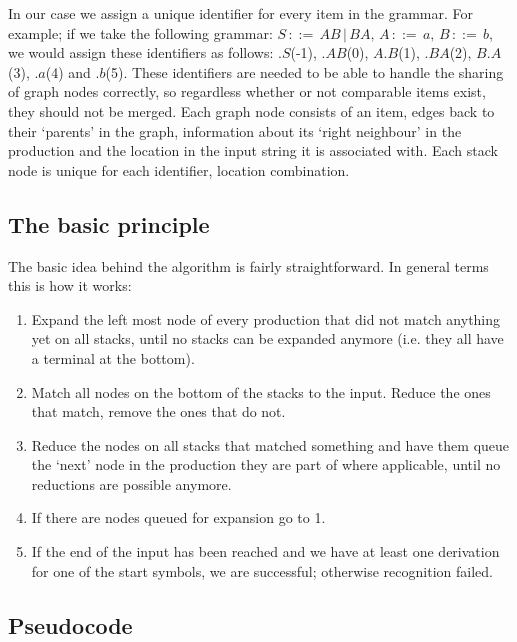 \documentclass[a4paper,10pt]{article}
\begin{document}
In our case we assign a unique identifier for every item in the grammar. For example; if we take the following grammar: $S\,::=\,AB\,|\,BA,\,A\,::=\,a,\,B\,::=\,b$, we would assign these identifiers as follows: $.S$(-1), $.AB$(0), $A.B$(1), $.BA$(2), $B.A$(3), $.a$(4) and $.b$(5). These identifiers are needed to be able to handle the sharing of graph nodes correctly, so regardless whether or not comparable items exist, they should not be merged. Each graph node consists of an item, edges back to their `parents' in the graph, information about its `right neighbour' in the production and the location in the input string it is associated with. Each stack node is unique for each identifier, location combination.

\subsection{The basic principle}

The basic idea behind the algorithm is fairly straightforward. In general terms this is how it works:

\begin{enumerate}
 \setlength{\itemsep}{0pt}
 \setlength{\parskip}{0pt}
 \setlength{\parsep}{0pt}

 \item Expand the left most node of every production that did not match anything yet on all stacks, until no stacks can be expanded anymore (i.e. they all have a terminal at the bottom).
 \item Match all nodes on the bottom of the stacks to the input. Reduce the ones that match, remove the ones that do not.
 \item Reduce the nodes on all stacks that matched something and have them queue the `next' node in the production they are part of where applicable, until no reductions are possible anymore.
 \item If there are nodes queued for expansion go to 1.
 \item If the end of the input has been reached and we have at least one derivation for one of the start symbols, we are successful; otherwise recognition failed.
\end{enumerate}

\pagebreak
\subsection{Pseudocode}
\end{document}
